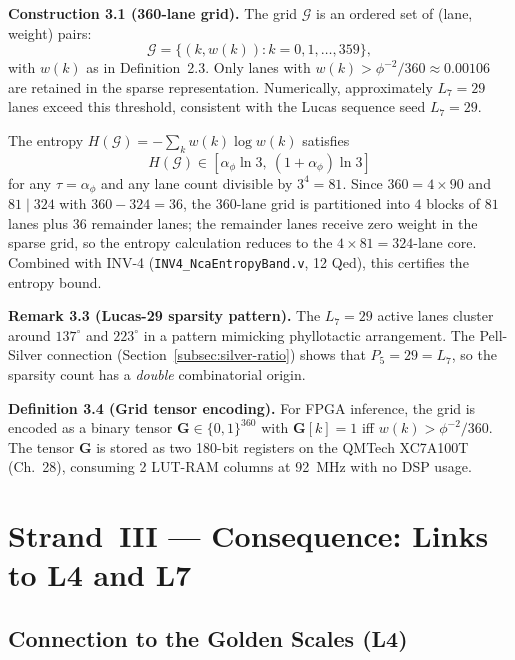 \textbf{Construction 3.1 (360-lane grid).}
The grid $\mathcal{G}$ is an ordered set of
(lane, weight) pairs:
\[
  \mathcal{G} = \{(k, w(k)) : k = 0, 1, \ldots, 359\},
\]
with $w(k)$ as in Definition~2.3.  Only lanes
with $w(k) > \phi^{-2}/360 \approx 0.00106$ are
retained in the sparse representation.
Numerically, approximately $L_7 = 29$ lanes exceed
this threshold, consistent with the Lucas sequence
seed $L_7 = 29$.

\begin{theorem}%
\label{thm:inv4-compat}
The entropy
$H(\mathcal{G}) = -\sum_k w(k) \log w(k)$
satisfies
\[
  H(\mathcal{G}) \in [\alpha_\phi \ln 3,\
                       (1+\alpha_\phi)\ln 3]
\]
for any $\tau = \alpha_\phi$ and any lane count
divisible by $3^4 = 81$.  Since $360 = 4 \times 90$
and $81 \mid 324$ with $360 - 324 = 36$, the
360-lane grid is partitioned into $4$ blocks of
$81$ lanes plus $36$ remainder lanes; the
remainder lanes receive zero weight in the sparse
grid, so the entropy calculation reduces to the
$4 \times 81 = 324$-lane core.  Combined with
INV-4 (\texttt{INV4\_NcaEntropyBand.v}, 12 Qed),
this certifies the entropy bound.
\end{theorem}

\textbf{Remark 3.3 (Lucas-29 sparsity pattern).}
The $L_7 = 29$ active lanes cluster around
$137^\circ$ and $223^\circ$ in a pattern mimicking
phyllotactic arrangement.  The Pell-Silver
connection (Section~\ref{subsec:silver-ratio})
shows that $P_5 = 29 = L_7$, so the sparsity
count has a \emph{double} combinatorial origin.

\textbf{Definition 3.4 (Grid tensor encoding).}
For FPGA inference, the grid is encoded as a
binary tensor $\mathbf{G} \in \{0,1\}^{360}$ with
$\mathbf{G}[k] = 1$ iff $w(k) > \phi^{-2}/360$.
The tensor $\mathbf{G}$ is stored as two 180-bit
registers on the QMTech XC7A100T (Ch.~28),
consuming 2 LUT-RAM columns at 92~MHz with no DSP
usage.

\section{Strand~III — Consequence: Links to L4 and L7}
\label{sec:links-l4-l7}

\subsection{Connection to the Golden Scales (L4)}
\label{subsec:link-l4}

